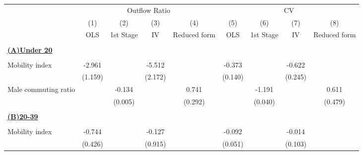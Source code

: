 \begin{tabular}{l*{8}{c}} \toprule
                    &\multicolumn{4}{c}{Outflow Ratio}                                                      &\multicolumn{4}{c}{CV}                                                                 \\\cmidrule(lr){2-5}\cmidrule(lr){6-9}
                    &\multicolumn{1}{c}{(1)}         &\multicolumn{1}{c}{(2)}         &\multicolumn{1}{c}{(3)}         &\multicolumn{1}{c}{(4)}         &\multicolumn{1}{c}{(5)}         &\multicolumn{1}{c}{(6)}         &\multicolumn{1}{c}{(7)}         &\multicolumn{1}{c}{(8)}         \\
                    &         OLS         &   1st Stage         &          IV         &Reduced form         &         OLS         &   1st Stage         &          IV         &Reduced form         \\
\hline \\ \multicolumn{9}{l}{\textbf{\underline{(A)Under 20}}} \\\\[-1ex]
Mobility index      &      -2.961\sym{**} &                     &      -5.512\sym{**} &                     &      -0.373\sym{***}&                     &      -0.622\sym{**} &                     \\
                    &     (1.159)         &                     &     (2.172)         &                     &     (0.140)         &                     &     (0.245)         &                     \\
\addlinespace
Male commuting ratio&                     &      -0.134\sym{***}&                     &       0.741\sym{**} &                     &      -1.191\sym{***}&                     &       0.611         \\
                    &                     &     (0.005)         &                     &     (0.292)         &                     &     (0.040)         &                     &     (0.479)         \\
\hline \\ \multicolumn{9}{l}{\textbf{\underline{(B)20-39}}} \\\\[-1ex]
Mobility index      &      -0.744\sym{*}  &                     &      -0.127         &                     &      -0.092\sym{*}  &                     &      -0.014         &                     \\
                    &     (0.426)         &                     &     (0.915)         &                     &     (0.051)         &                     &     (0.103)         &                     \\

\end{tabular}
